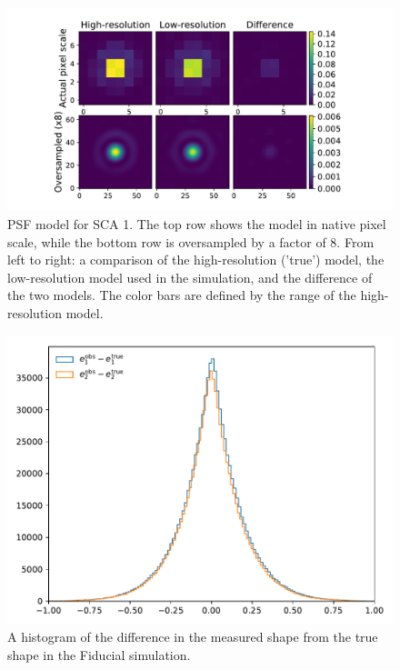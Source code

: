 \documentclass[aps,prd, amsmath,amssymb,superscriptaddress,showkeys,nofootinbib,reprint,preprintnumbers]{revtex4-1}
\begin{document}
\begin{figure}
\begin{center}
\includegraphics[width=\columnwidth]{figures/psf.pdf}
\end{center}
\caption[]{
PSF model for SCA 1. The top row shows the model in native pixel scale, while the bottom row is oversampled by a factor of 8. From left to right: a comparison of the high-resolution ('true') model, the low-resolution model used in the simulation, and the difference of the two models. The color bars are defined by the range of the high-resolution model.
\label{fig:psf}}
\end{figure}

\begin{figure}
\begin{center}
\includegraphics[width=\columnwidth]{figures/shape_hist.pdf}
\end{center}
\caption[]{
A histogram of the difference in the measured shape from the true shape in the Fiducial simulation.
\label{fig:shape_hist}}
\end{figure}
\end{document}
